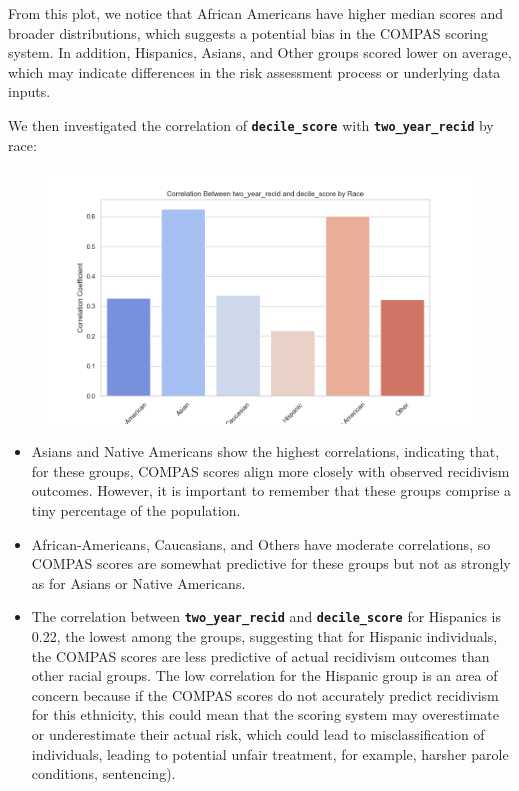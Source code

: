 From this plot, we notice that African Americans have higher median scores and broader distributions, which suggests a potential bias in the COMPAS scoring system. In addition, Hispanics, Asians, and Other groups scored lower on average, which may indicate differences in the risk assessment process or underlying data inputs.


We then investigated the correlation of \textbf{\texttt{decile\_score}} with \textbf{\texttt{two\_year\_recid}} by race:

\begin{figure}
	\centering
	\includegraphics[width=0.9\linewidth]{img/correlation_by_race}
	\caption{}
	\label{fig:correlationbyrace}
\end{figure}

\begin{itemize}
	\item Asians and Native Americans show the highest correlations, indicating that, for these groups, COMPAS scores align more closely with observed recidivism outcomes. However, it is important to remember that these groups comprise a tiny percentage of the population.
	
	\item African-Americans, Caucasians, and Others have moderate correlations, so COMPAS scores are somewhat predictive for these groups but not as strongly as for Asians or Native Americans.
	
	\item The correlation between \textbf{\texttt{two\_year\_recid}} and \textbf{\texttt{decile\_score}} for Hispanics is 0.22, the lowest among the groups, suggesting that for Hispanic individuals, the COMPAS scores are less predictive of actual recidivism outcomes than other racial groups. The low correlation for the Hispanic group is an area of concern because if the COMPAS scores do not accurately predict recidivism for this ethnicity, this could mean that the scoring system may overestimate or underestimate their actual risk, which could lead to misclassification of individuals, leading to potential unfair treatment, for example, harsher parole conditions, sentencing).
\end{itemize}

